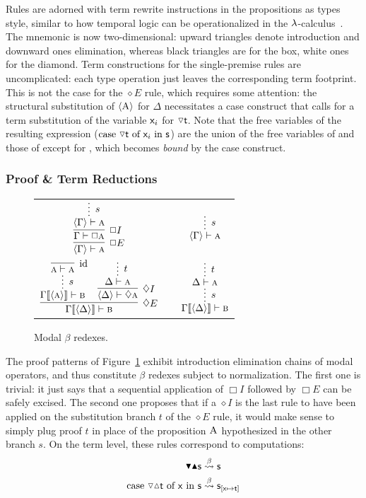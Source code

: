 Rules are adorned with term rewrite instructions in the propositions as types style, similar to how temporal logic can be operationalized in the $\mathnormal{\lambda}$-calculus~\cite{wansing2002sequent}.
The mnemonic is now two-dimensional: upward triangles denote introduction and downward ones elimination, whereas black triangles are for the box, white ones for the diamond.
Term constructions for the single-premise rules are uncomplicated: each type operation just leaves the corresponding term footprint.
This is not the case for the $\diamond E$ rule, which requires some attention:
the structural substitution of $\langle{ \ensuremath{\normalfont\textsc{A}}}\rangle$ for $\Delta$ necessitates a case construct that calls for a term substitution of the variable $\mathsf{\mathsf{x}_{\mathnormal{i}} }$ for $\diaelim\smallterm{t}$.
Note that the free variables of the resulting expression ($\caseof{\diaelim t}{\vari }{s}$) are the union of the free variables of  and those of  except for \smallterm{\vari }, which becomes \textit{bound} by the case construct.

\subsubsection{Proof \& Term Reductions}
\begin{figure}
	\centering
		\begin{tabularx}{0.85\textwidth}{@{}ccc@{}}
		$\infer[\Box E]{\bracket{\Gamma} \vdash \prop{a}}{
			\infer[\Box I]{\Gamma \vdash \Box \prop{a}}{
				\infer*[s]{\bracket{\Gamma} \vdash  \prop{a}}{}
			}
		}
		$
		&
		\raisebox{10pt}{$\implies$}
		&
		$\infer*[s]{\bracket{\Gamma} \vdash \prop{a}}{}
		$\\[\smallsep]
		$\infer[\diamond E]{\Gamma\ctx{\bracket{\Delta}} \vdash \prop{b}}{
			\infer*[s]{\Gamma\ctx{\bracket{\prop{a}}} \vdash \prop{b}}{
				\infer[\Ax]{\prop{a} \vdash \prop{a}}{}}
			&
			\infer[\diamond I]{\bracket{\Delta} \vdash \diamond\prop{a}}{
				\infer*[t]{\Delta \vdash \prop{a}}{}
			}
		}
		$
		&
		\raisebox{20pt}{$\implies$}
		&
		$\infer*[s]{\Gamma\ctx{\bracket{\Delta}} \vdash \prop{b}}{
			\infer*[t]{\Delta \vdash \prop{a}}{}
		}
		$
		\end{tabularx}
		\caption{Modal $\beta$ redexes.}
		\label{figure:modal_beta_reductions}
\end{figure}

The proof patterns of Figure~\ref{figure:modal_beta_reductions} exhibit introduction elimination chains of modal operators, and thus constitute $\beta$ redexes subject to normalization.
The first one is trivial: it just says that a sequential application of $\Box I$ followed by $\Box E$ can be safely excised.
The second one proposes that if a $\diamond I$ is the last rule to have been applied on the substitution branch $t$ of the $\diamond E$ rule, it would make sense to simply plug proof $t$ in place of the proposition $\normalfont\textsc{A}$ hypothesized in the other  branch $s$.
On the term level, these rules correspond to computations:
\begin{align}
\boxelim \boxintro \term{s} & \bred \term{s}\\
\cterm{case \term{\diaelim \diaintro t} of \term{x} in \term{s}} & \bred \term{s}_{[\term{x} \mapsto \term{t}]}
\end{align}

